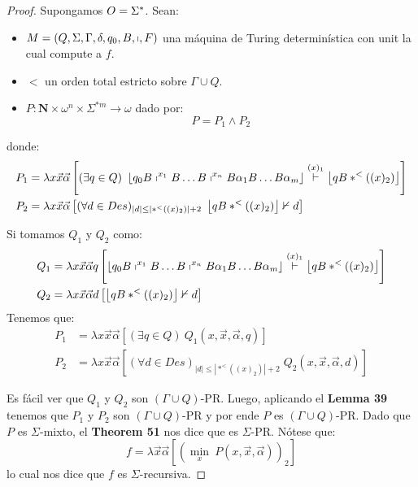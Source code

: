 	\begin{proof}
    Supongamos $O=\Sigma^{\ast}$. Sean:
    \begin{itemize}
      \item $M = \left(Q,\Sigma,\Gamma,\delta,q_{0},B,\shortmid,F\right)$ una máquina de Turing determinística con unit
        la cual compute a $f$.
      \item $<$ un orden total estricto sobre $\Gamma \cup Q$.
      \item $P: \mathbf{N} \times \omega^{n} \times \Sigma^{\ast m} \rightarrow \omega$ dado por:
        \[
          P = P_1 \wedge P_2
        \]
      \end{itemize}
    \PN donde:
    \begin{align*}
      P_1 &= \lambda x\vec{x}\vec{\alpha} \left[(\exists q \in Q) \ \left\lfloor q_{0} B \shortmid^{x_{1}} B \dotsc B
             \shortmid^{x_{n}} B \alpha_{1} B \dotsc B \alpha_{m} \right\rfloor \overset{(x)_{1}}{\vdash} \left\lfloor
             q B \ast^{<}((x)_{2}) \right\rfloor\right] \\
      P_2 &= \lambda x\vec{x}\vec{\alpha} \left[(\forall d \in Des)_{\left\vert d \right\vert \leq \left\vert
             \ast^{<}((x)_{2}) \right\vert + 2} \; \left\lfloor q B \ast^{<}((x)_{2}) \right\rfloor \nvdash d\right]
    \end{align*}

    \PN Si tomamos $Q_1$ y $Q_2$ como:
    \begin{align*}
      Q_1 &= \lambda x\vec{x}\vec{\alpha}q \left[\left\lfloor q_{0} B \shortmid^{x_{1}} B \dotsc B \shortmid^{x_{n}} B
             \alpha_{1} B \dotsc B \alpha_{m} \right\rfloor \overset{(x)_{1}}{\vdash} \left\lfloor q B \ast^{<}((x)_{2})
             \right\rfloor\right] \\
      Q_2 &= \lambda x\vec{x}\vec{\alpha}d \left[\left\lfloor q B \ast^{<}((x)_{2}) \right\rfloor \nvdash d\right]
    \end{align*}
    \PN Tenemos que:
    \begin{align*}
      P_1 &= \lambda x\vec{x}\vec{\alpha} \left[(\exists q \in Q) \ Q_1(x,\vec{x},\vec{\alpha},q)\right] \\
      P_2 &= \lambda x\vec{x}\vec{\alpha} \left[(\forall d \in Des)_{\left\vert d \right\vert \leq \left\vert \ast^{<}
             ((x)_{2}) \right\vert + 2} \; Q_2(x,\vec{x},\vec{\alpha},d)\right]
    \end{align*}

    \PN Es fácil ver que $Q_1$ y $Q_2$ son $(\Gamma \cup Q)$-PR. Luego, aplicando el \textbf{Lemma 39} tenemos que $P_1$
    y $P_2$ son $(\Gamma \cup Q)$-PR y por ende $P$ es $(\Gamma \cup Q)$-PR. Dado que $P$ es $\Sigma $-mixto, el
    \textbf{Theorem 51} nos dice que es $\Sigma $-PR. Nótese que:
    \[
      f = \lambda \vec{x}\vec{\alpha} \left[\left(\min_{x} \ P(x,\vec{x},\vec{\alpha})\right)_{2}\right]
    \]
    \PN lo cual nos dice que $f$ es $\Sigma$-recursiva.
  \end{proof}

